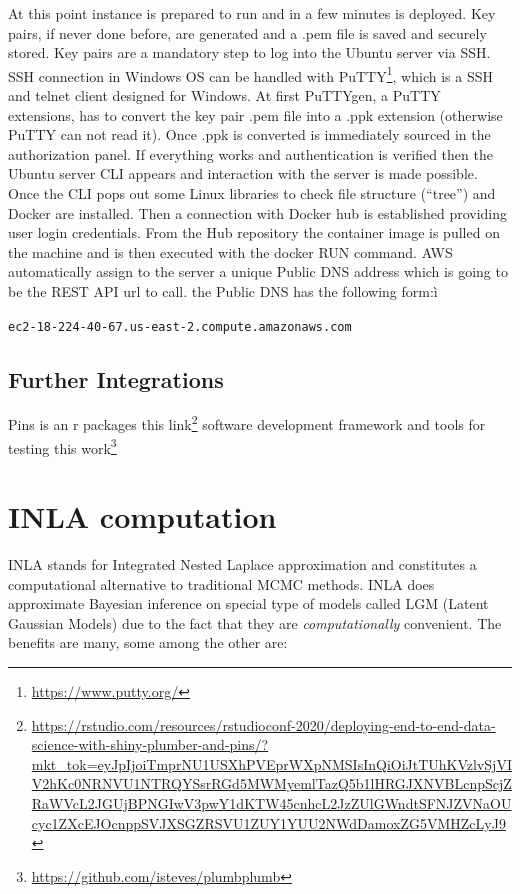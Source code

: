 \documentclass[
  12pt,
  a4paper,
  oneside]{book}
\DeclareRobustCommand{\href}[2]{#2\footnote{\url{#1}}}
\theoremstyle{definition}
\theoremstyle{definition}
\theoremstyle{definition}
\theoremstyle{remark}
\begin{document}
At this point instance is prepared to run and in a few minutes is deployed. Key pairs, if never done before, are generated and a .pem file is saved and securely stored. Key pairs are a mandatory step to log into the Ubuntu server via SSH. SSH connection in Windows OS can be handled with \href{https://www.putty.org/}{PuTTY}, which is a SSH and telnet client designed for Windows. At first PuTTYgen, a PuTTY extensions, has to convert the key pair .pem file into a .ppk extension (otherwise PuTTY can not read it). Once .ppk is converted is immediately sourced in the authorization panel. If everything works and authentication is verified then the Ubuntu server CLI appears and interaction with the server is made possible.
Once the CLI pops out some Linux libraries to check file structure (``tree'') and Docker are installed. Then a connection with Docker hub is established providing user login credentials. From the Hub repository the container image is pulled on the machine and is then executed with the docker RUN command.
AWS automatically assign to the server a unique Public DNS address which is going to be the REST API url to call.
the Public DNS has the following form:ì

\texttt{ec2-18-224-40-67.us-east-2.compute.amazonaws.com}

\hypertarget{further-integrations}{%
\section{Further Integrations}\label{further-integrations}}

Pins is an r packages \href{https://rstudio.com/resources/rstudioconf-2020/deploying-end-to-end-data-science-with-shiny-plumber-and-pins/?mkt_tok=eyJpIjoiTmprNU1USXhPVEprWXpNMSIsInQiOiJtTUhKVzlvSjVIV2hKc0NRNVU1NTRQYSsrRGd5MWMyemlTazQ5b1lHRGJXNVBLcnpScjZRaWVcL2JGUjBPNGIwV3pwY1dKTW45cnhcL2JzZUlGWndtSFNJZVNaOUcyc1ZXcEJOcnppSVJXSGZRSVU1ZUY1YUU2NWdDamoxZG5VMHZcLyJ9}{this link}
software development framework and tools for testing \href{https://github.com/isteves/plumbplumb}{this work}

\hypertarget{inla}{%
\chapter{INLA computation}\label{inla}}

INLA \citep{Rue2009} stands for Integrated Nested Laplace approximation and constitutes a computational alternative to traditional MCMC methods. INLA does approximate Bayesian inference on special type of models called LGM (Latent Gaussian Models) due to the fact that they are \emph{computationally} convenient. The benefits are many, some among the other are:
\end{document}
